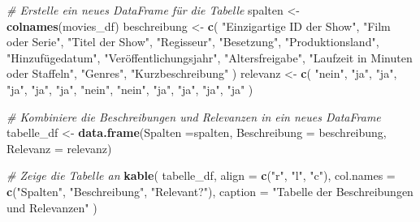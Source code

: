 \documentclass[
]{article}
\newenvironment{Shaded}{\begin{snugshade}}{\end{snugshade}}
\newcommand{\AttributeTok}[1]{\textcolor[rgb]{0.13,0.29,0.53}{#1}}
\newcommand{\CommentTok}[1]{\textcolor[rgb]{0.56,0.35,0.01}{\textit{#1}}}
\newcommand{\FunctionTok}[1]{\textcolor[rgb]{0.13,0.29,0.53}{\textbf{#1}}}
\newcommand{\NormalTok}[1]{#1}
\newcommand{\OtherTok}[1]{\textcolor[rgb]{0.56,0.35,0.01}{#1}}
\newcommand{\StringTok}[1]{\textcolor[rgb]{0.31,0.60,0.02}{#1}}
\begin{document}
\begin{Shaded}
\begin{Highlighting}[]
\CommentTok{\# Erstelle ein neues DataFrame für die Tabelle}
\NormalTok{spalten }\OtherTok{\textless{}{-}} \FunctionTok{colnames}\NormalTok{(movies\_df)}
\NormalTok{beschreibung }\OtherTok{\textless{}{-}} \FunctionTok{c}\NormalTok{(}
    \StringTok{"Einzigartige ID der Show"}\NormalTok{, }
    \StringTok{"Film oder Serie"}\NormalTok{, }
    \StringTok{"Titel der Show"}\NormalTok{, }
    \StringTok{"Regisseur"}\NormalTok{, }
    \StringTok{"Besetzung"}\NormalTok{,}
    \StringTok{"Produktionsland"}\NormalTok{,}
    \StringTok{"Hinzufügedatum"}\NormalTok{,}
    \StringTok{"Veröffentlichungsjahr"}\NormalTok{,}
    \StringTok{"Altersfreigabe"}\NormalTok{,}
    \StringTok{"Laufzeit in Minuten oder Staffeln"}\NormalTok{,}
    \StringTok{"Genres"}\NormalTok{,}
    \StringTok{"Kurzbeschreibung"}
\NormalTok{)}
\NormalTok{relevanz }\OtherTok{\textless{}{-}} \FunctionTok{c}\NormalTok{(}
    \StringTok{"nein"}\NormalTok{,}
    \StringTok{"ja"}\NormalTok{,}
    \StringTok{"ja"}\NormalTok{,}
    \StringTok{"ja"}\NormalTok{,}
    \StringTok{"ja"}\NormalTok{,}
    \StringTok{"ja"}\NormalTok{,}
    \StringTok{"nein"}\NormalTok{,}
    \StringTok{"nein"}\NormalTok{,}
    \StringTok{"ja"}\NormalTok{,}
    \StringTok{"ja"}\NormalTok{,}
    \StringTok{"ja"}\NormalTok{,}
    \StringTok{"ja"}
\NormalTok{)}

\CommentTok{\# Kombiniere die Beschreibungen und Relevanzen in ein neues DataFrame}
\NormalTok{tabelle\_df }\OtherTok{\textless{}{-}} \FunctionTok{data.frame}\NormalTok{(}\AttributeTok{Spalten =}\NormalTok{spalten, }\AttributeTok{Beschreibung =}\NormalTok{ beschreibung, }\AttributeTok{Relevanz =}\NormalTok{ relevanz)}

\CommentTok{\# Zeige die Tabelle an}
\FunctionTok{kable}\NormalTok{(}
\NormalTok{  tabelle\_df,}
  \AttributeTok{align =} \FunctionTok{c}\NormalTok{(}\StringTok{"r"}\NormalTok{, }\StringTok{"l"}\NormalTok{, }\StringTok{"c"}\NormalTok{),}
  \AttributeTok{col.names =} \FunctionTok{c}\NormalTok{(}\StringTok{"Spalten"}\NormalTok{, }\StringTok{"Beschreibung"}\NormalTok{, }\StringTok{"Relevant?"}\NormalTok{),}
  \AttributeTok{caption =} \StringTok{"Tabelle der Beschreibungen und Relevanzen"}
\NormalTok{)}
\end{Highlighting}
\end{Shaded}
\end{document}
